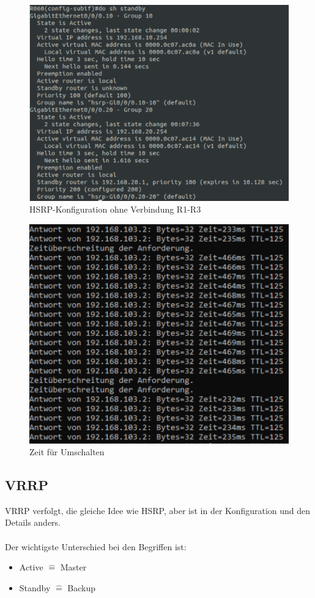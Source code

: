 \documentclass[a4paper, ngerman]{article}
\begin{document}
\begin{figure}[H]
    \centering
    \includegraphics[scale=0.23]{screenshots/sh standby after.png}
    \caption{HSRP-Konfiguration ohne Verbindung R1-R3}
\end{figure}

\begin{figure}[H]
    \centering
    \includegraphics[scale=0.23]{screenshots/umschalten ping.png}
    \caption{Zeit für Umschalten}
\end{figure}

\subsection{VRRP}
VRRP verfolgt, die gleiche Idee wie HSRP, aber ist in der Konfiguration und den Details anders.
\\ \\
Der wichtigste Unterschied bei den Begriffen ist:
\begin{itemize}
    \item Active $\widehat{=}$ Master
    \item Standby $\widehat{=}$ Backup
\end{itemize}
\end{document}

